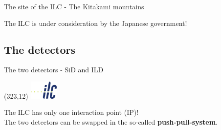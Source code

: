 \documentclass[xcolor={dvipsnames}]{beamer}
\newcommand{\ilclogo}{
  \setlength{\TPHorizModule}{1pt}
  \setlength{\TPVertModule}{1pt}
  \begin{textblock}{1}(323,12)
   \includegraphics[width=40pt,height=26pt]{figures/ILC.jpeg}
  \end{textblock}
}
\begin{document}
\begin{frame}{The site of the ILC - The Kitakami mountains}
\begin{center}
\begin{minipage}[t]{0.48\textwidth}
\end{minipage}
\begin{block}{}
 The ILC is under consideration by the Japanese government!
\end{block}
\end{center}
\end{frame}

\subsection{The detectors}
\begin{frame}{The two detectors - SiD and ILD}
\ilclogo
\begin{block}{}
The ILC has only one interaction point (IP)!\\
The two detectors can be swapped in the so-called \textbf{push-pull-system}.
\end{block}


\end{frame}
\end{document}
